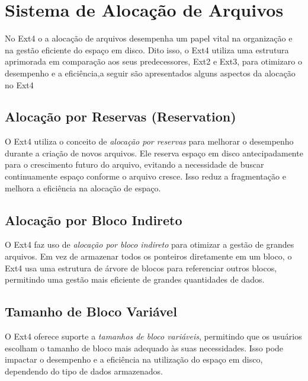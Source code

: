 \documentclass[
	12pt,				%
	openright,			%
	oneside,			%
	a4paper,			%
	chapter=TITLE,		%
	english,			%
	french,				%
	spanish,			%
	brazil				%
	]{abntex2}
\theoremstyle{definition}
\begin{document}
\chapter{Sistema de Alocação de Arquivos}
No Ext4 o a alocação de arquivos desempenha um papel vital na organização e na gestão eficiente do espaço em disco. 
Dito isso, o Ext4 utiliza uma estrutura aprimorada em comparação aos seus predecessores, Ext2 e Ext3, para otimizaro 
o desempenho e a eficiência,a seguir são apresentados alguns aspectos da alocação no Ext4


\section{Alocação por Reservas (Reservation)}
O Ext4 utiliza o conceito de \textit{alocação por reservas} para 
melhorar o desempenho durante a criação de novos arquivos. Ele reserva espaço em disco antecipadamente para o crescimento futuro do arquivo, evitando a necessidade de buscar continuamente espaço conforme o arquivo cresce. Isso reduz a fragmentação e melhora a eficiência na alocação de espaço.

\section{Alocação por Bloco Indireto}
O Ext4 faz uso de \textit{alocação por bloco indireto} para otimizar a gestão de grandes arquivos. Em vez de armazenar todos os ponteiros diretamente em um bloco, o Ext4 usa uma estrutura de árvore de blocos para referenciar outros blocos, permitindo uma gestão mais eficiente de grandes quantidades de dados.

\section{Tamanho de Bloco Variável}
O Ext4 oferece suporte a \textit{tamanhos de bloco variáveis}, permitindo que os usuários escolham o tamanho de bloco mais adequado às suas necessidades. Isso pode impactar o desempenho e a eficiência na utilização do espaço em disco, dependendo do tipo de dados armazenados.
\end{document}
